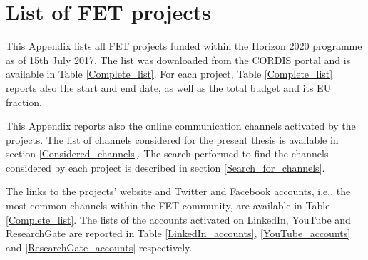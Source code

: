 \chapter{List of FET projects} \label{List_of_FET_projects}
This Appendix lists all FET projects funded within the Horizon 2020 programme as of 15th July 2017. The list was downloaded from the CORDIS portal \cite{CORDIS} and is available in Table \ref{Complete_list}. For each project, Table \ref{Complete_list} reports also the start and end date, as well as the total budget and its EU fraction.  

This Appendix reports also the online communication channels activated by the projects. The list of channels considered for the present thesis is available in section \ref{Considered_channels}. The search performed to find the channels considered by each project is described in section \ref{Search_for_channels}.

The links to the projects' website and Twitter and Facebook  accounts, i.e., the most common channels within the FET community, are available in Table \ref{Complete_list}. The lists of the accounts activated on LinkedIn, YouTube and ResearchGate are reported in Table \ref{LinkedIn_accounts}, \ref{YouTube_accounts} and \ref{ResearchGate_accounts} respectively.

